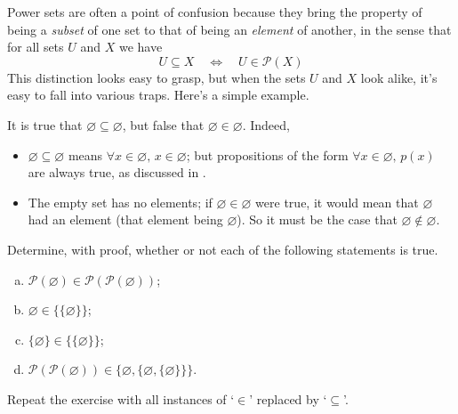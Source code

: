Power sets are often a point of confusion because they bring the property of being a \textit{subset} of one set to that of being an \textit{element} of another, in the sense that for all sets $U$ and $X$ we have
\[ U \subseteq X \quad \Leftrightarrow \quad U \in \mathcal{P}(X) \]
This distinction looks easy to grasp, but when the sets $U$ and $X$ look alike, it's easy to fall into various traps. Here's a simple example.

\begin{example}
It is true that $\varnothing \subseteq \varnothing$, but false that $\varnothing \in \varnothing$. Indeed,
\begin{itemize}
\item $\varnothing \subseteq \varnothing$ means $\forall x \in \varnothing,\, x \in \varnothing$; but propositions of the form $\forall x \in \varnothing,\, p(x)$ are always true, as discussed in .
\item The empty set has no elements; if $\varnothing \in \varnothing$ were true, it would mean that $\varnothing$ had an element (that element being $\varnothing$). So it must be the case that $\varnothing \not \in \varnothing$.
\end{itemize}
\end{example}

\begin{exercise}
Determine, with proof, whether or not each of the following statements is true.
\begin{enumerate}[(a)]
\item $\mathcal{P}(\varnothing) \in \mathcal{P}(\mathcal{P}(\varnothing))$;
\item $\varnothing \in \{ \{ \varnothing \} \}$;
\item $\{ \varnothing \} \in \{ \{ \varnothing \} \}$;
\item $\mathcal{P}(\mathcal{P}(\varnothing)) \in \{ \varnothing, \{ \varnothing, \{ \varnothing \} \} \}$.
\end{enumerate}
Repeat the exercise with all instances of `$\in$' replaced by `$\subseteq$'.
\end{exercise}
